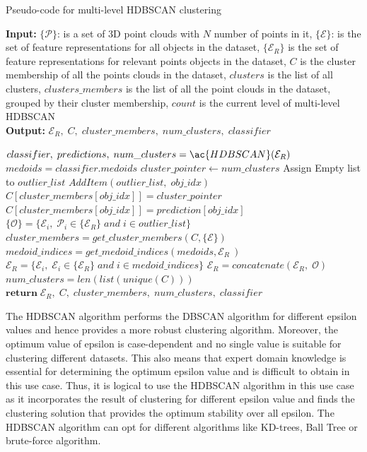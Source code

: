 \begin{algorithm}[H]
    \caption{Pseudo-code for multi-level \ac{HDBSCAN} clustering}\label{alg:multi_level_hdbscan}
    \textbf{Input:} $\{\mathcal{P}\}$: is a set of 3D point clouds with $\mathit{N}$ number of points in it, $\{\mathcal{E}\}$: is the set of feature representations for all objects in the dataset, $\{\mathcal{E}_R\}$ is the set of feature representations for relevant points objects in the dataset, $C$ is the cluster membership of all the points clouds in the dataset, $clusters$ is the list of all clusters, $clusters\_members$ is the list of all the point clouds in the dataset, grouped by their cluster membership, $count$ is the current level of multi-level \ac{HDBSCAN}\\
    \textbf{Output:} $\mathcal{E}_R, \; C, \; cluster\_members, \; num\_clusters, \; classifier$ 
    \begin{algorithmic}[1] 
        \State $classifier,\; predictions,\; num\_clusters = \ac{HDBSCAN}(\mathcal{E}_R)$
        \State $medoids = classifier.medoids$
        \State $cluster\_pointer \leftarrow num\_clusters$
        \State Assign Empty list to $outlier\_list$
                \State $AddItem(outlier\_list, \; obj\_idx)$
                \State $C[cluster\_members[obj\_idx]] = cluster\_pointer$
            \Else
                \State $C[cluster\_members[obj\_idx]] = prediction[obj\_idx]$
            \EndIf
        \EndFor
        \State $\{\mathcal{O}\} = \{\mathcal{E}_i, \; \mathcal{P}_i \in \{\mathcal{E}_R\} \; and \; i \in outlier\_list\}$
        \State $cluster\_members = get\_cluster\_members(C,\{\mathcal{E}\})$
        \State $medoid\_indices = get\_medoid\_indices(medoids, \mathcal{E}_R\ )$
        \State $\mathcal{E}_R = \{\mathcal{E}_i, \; \mathcal{E}_i \in \{\mathcal{E}_R\} \; and \; i \in medoid\_indices\}$
            \State $\mathcal{E}_R = concatenate(\mathcal{E}_R, \; \mathcal{O})$
        \EndIf
            \State $num\_clusters = len(list(unique(C)))$
        \EndIf
        \State $\mathbf{return \;}\mathcal{E}_R, \; C, \; cluster\_members, \; num\_clusters, \; classifier$ 
    \end{algorithmic}
\end{algorithm}

 The \ac{HDBSCAN} algorithm performs the \ac{DBSCAN} algorithm for different epsilon values and hence provides a more robust clustering algorithm. Moreover, the optimum value of epsilon is case-dependent and no single value is suitable for clustering different datasets. This also means that expert domain knowledge is essential for determining the optimum epsilon value and is difficult to obtain in this use case. Thus, it is logical to use the \ac{HDBSCAN} algorithm in this use case as it incorporates the result of clustering for different epsilon value and finds the clustering solution that provides the optimum stability over all epsilon. The \ac{HDBSCAN} algorithm can opt for different algorithms like \ac{KD}-trees, Ball Tree or brute-force algorithm. 

